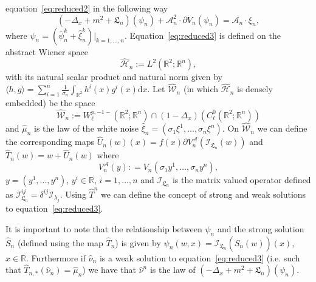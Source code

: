 \documentclass[a4paper,10pt]{article}
\newcommand{\assign}{:=}
\newcommand{\asterisk}{\mathord{*}}
\newcommand{\mathd}{\mathrm{d}}
\newcommand{\nobracket}{}
\begin{document}
equation~{\eqref{eq:reduced2}} in the following way
\begin{equation}
  (- \Delta_x + m^2 + \mathfrak{L}_n) (\psi_n) + \mathcal{A}^2_n \cdot
  \partial V_n (\psi_n) = \mathcal{A}_n \cdot \xi_n, \label{eq:reduced3}
\end{equation}
where $\nobracket \psi_n = (\bar{\psi}_n^k + \hat{\xi}_n^k) |_{k = 1, \ldots,
n} \nobracket .$ Equation~{\eqref{eq:reduced3}} is defined on the abstract
Wiener space
\[ \widehat{\mathcal{H}}_n \assign L^2 (\mathbb{R}^2 ; \mathbb{R}^n), \]
with its natural scalar product and natural norm given by $\langle h, g
\rangle = \sum_{i = 1}^n \frac{1}{\sigma_n} \int_{\mathbb{R}^2} h^i (x) g^i
(x) \mathd x$. Let $\widehat{\mathcal{W}}_n$ (in which
$\widehat{\mathcal{H}}_n$ is densely embedded) be the space
\[ \widehat{\mathcal{W}}_n \assign W^{p, - 1 -}_{\ell} (\mathbb{R}^2 ;
   \mathbb{R}^n) \cap (1 - \Delta_x) (C^0_{\ell} (\mathbb{R}^2 ;
   \mathbb{R}^n)) \]
and $\hat{\mu}_n$ is the law of the white noise $\hat{\xi}_n = (\sigma_1
\xi^1, \ldots, \sigma_n \xi^n)$. On $\widehat{\mathcal{W}}_n$ we can define
the corresponding maps $\hat{U}_n (w) (x) = f (x) \partial V^{\mathcal{A}}_n
(\mathcal{I}_{\mathfrak{L}_n} (w))$ and $\hat{T}_n (w) = w + \hat{U}_n (w)$
where
\[ V^{\mathcal{A}}_n (y) : = V_n (\sigma_1 y^1, \ldots, \sigma_n y^n), \]
$y = (y^1, \ldots, y^n)$, $y^i \in \mathbb{R}$, $i = 1, \ldots, n$ and
$\mathcal{I}_{\mathfrak{L}_n}$ is the matrix valued operator defined as
$\mathcal{I}_{\mathfrak{L}_n}^{i j} = \delta^{i j} \mathcal{I}_{\lambda_j}$.
Using $\hat{T}^n$ we can define the concept of strong and weak solutions to
equation~{\eqref{eq:reduced3}}.

\begin{remark}
  It is important to note that the relationship between $\psi_n$ and the
  strong solution $\hat{S}_n$ (defined using the map $\hat{T}_n$) is given by
  $\psi_n (w, x) = \mathcal{} \mathcal{I}_{\mathfrak{L}_n} (\hat{S}_n (w))
  (x)$, $x \in \mathbb{R}$. Furthermore if $\hat{\nu}_n$ is a weak solution to
  equation~{\eqref{eq:reduced3}} (i.e. such that $\hat{T}_{n, \asterisk}
  (\hat{\nu}_n) = \hat{\mu}_n$) we have that $\hat{\nu}^n$ is the law of $(-
  \Delta_x + m^2 + \mathfrak{L}_n) (\psi_n)$.
\end{remark}
\end{document}
